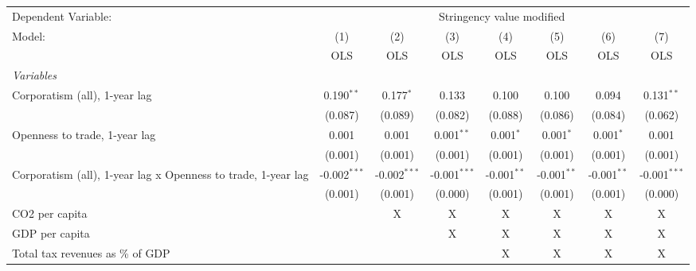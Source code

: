
\begingroup
\centering
\begin{tabular}{lccccccc}
   \toprule
   Dependent Variable: & \multicolumn{7}{c}{Stringency value modified}\\
   Model:                                                        & (1)            & (2)            & (3)            & (4)           & (5)           & (6)           & (7)\\  
                                                                 &  OLS           & OLS            & OLS            & OLS           & OLS           & OLS           & OLS\\  
   \midrule
   \emph{Variables}\\
   Corporatism (all), 1-year lag                                 & 0.190$^{**}$   & 0.177$^{*}$    & 0.133          & 0.100         & 0.100         & 0.094         & 0.131$^{**}$\\   
                                                                 & (0.087)        & (0.089)        & (0.082)        & (0.088)       & (0.086)       & (0.084)       & (0.062)\\   
   Openness to trade, 1-year lag                                 & 0.001          & 0.001          & 0.001$^{**}$   & 0.001$^{*}$   & 0.001$^{*}$   & 0.001$^{*}$   & 0.001\\   
                                                                 & (0.001)        & (0.001)        & (0.001)        & (0.001)       & (0.001)       & (0.001)       & (0.001)\\   
   Corporatism (all), 1-year lag x Openness to trade, 1-year lag & -0.002$^{***}$ & -0.002$^{***}$ & -0.001$^{***}$ & -0.001$^{**}$ & -0.001$^{**}$ & -0.001$^{**}$ & -0.001$^{***}$\\   
                                                                 & (0.001)        & (0.001)        & (0.000)        & (0.001)       & (0.001)       & (0.001)       & (0.000)\\   
   CO2 per capita                                                &                & X              & X              & X             & X             & X             & X\\  
   GDP per capita                                                &                &                & X              & X             & X             & X             & X\\  
   Total tax revenues as \% of GDP                               &                &                &                & X             & X             & X             & X\\  

\end{tabular}
